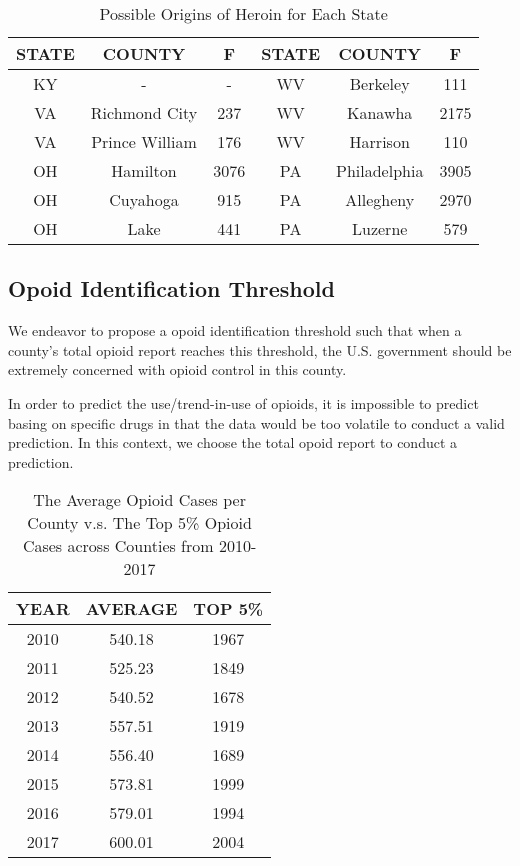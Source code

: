 \begin{table}[H]
	\centering
	\begin{tabular}{|c|c|c||c|c|c|}
		\hline
		\rowcolor[HTML]{656565} 
		{\color[HTML]{FFFFFF} \textbf{STATE}} & {\color[HTML]{FFFFFF} \textbf{COUNTY}} & {\color[HTML]{FFFFFF} \textbf{F}} &{\color[HTML]{FFFFFF} \textbf{STATE}} & {\color[HTML]{FFFFFF} \textbf{COUNTY}} & {\color[HTML]{FFFFFF} \textbf{F}}\\ \hline
		KY & - & - &WV & Berkeley & 111 \\ \hline
		VA & Richmond City & 237 &WV & Kanawha & 2175\\ \hline
		VA & Prince William & 176 & WV& Harrison&110 \\ \hline
		OH & Hamilton & 3076 &PA & Philadelphia & 3905 \\ \hline
		OH & Cuyahoga & 915 & PA & Allegheny & 2970 \\ \hline
		OH & Lake & 441 & PA & Luzerne & 579\\ \hline
	\end{tabular}
	\centering
	\caption{Possible Origins of Heroin for Each State}
\end{table}

\subsection{Opoid Identification Threshold}
We endeavor to propose a opoid identification threshold such that when a county's total opioid report reaches this threshold, the U.S. government should be extremely concerned with opioid control in this county.

In order to predict the use/trend-in-use of opioids, it is impossible to predict basing on specific drugs in that the data would be too volatile to conduct a valid prediction. In this context, we choose the total opoid report to conduct a prediction.

\begin{table}[H]
\centering
\begin{tabular}{|c|c|c|}
\hline
\rowcolor[HTML]{656565} 
{\color[HTML]{FFFFFF} \textbf{YEAR}} & {\color[HTML]{FFFFFF} \textbf{AVERAGE}} & {\color[HTML]{FFFFFF} \textbf{TOP 5\%}} \\ \hline
2010 & 540.18 & 1967 \\ \hline
2011 & 525.23 & 1849 \\ \hline
2012 & 540.52 & 1678 \\ \hline
2013 & 557.51 & 1919 \\ \hline
2014 & 556.40 & 1689 \\ \hline
2015 & 573.81 & 1999 \\ \hline
2016 & 579.01 & 1994 \\ \hline
2017 & 600.01 & 2004 \\ \hline
\end{tabular}
\centering
\caption{The Average Opioid Cases per County v.s. The Top 5\% Opioid Cases across Counties from 2010-2017}
\end{table}

